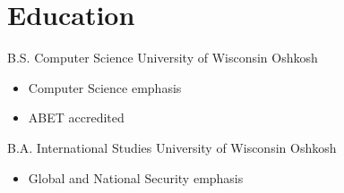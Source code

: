 \documentclass[12pt,letterpaper,sans]{moderncv}
\begin{document}
\makecvtitle
\section{Education} 
    {B.S. Computer Science} 
    {University of Wisconsin Oshkosh} 
    {} {}
    {\begin{itemize}
        \item Computer Science emphasis
        \item ABET accredited
    \end{itemize}}
    {B.A. International Studies} 
    {University of Wisconsin Oshkosh}
    {} {} 
    {\begin{itemize}
        \item Global and National Security emphasis
    \end{itemize}}
\end{document}
